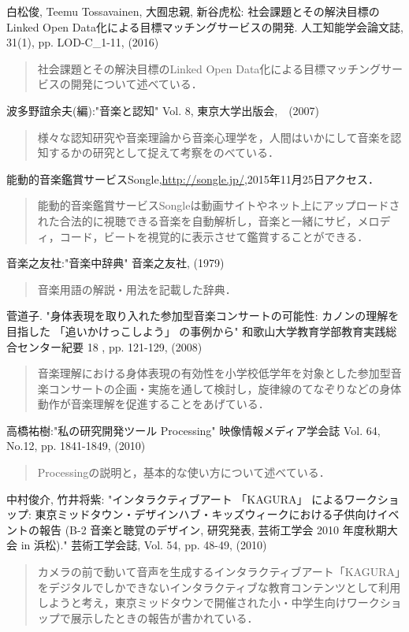 
\begin{thebibliography}{99}

白松俊, Teemu Tossavainen, 大囿忠親, 新谷虎松: 社会課題とその解決目標のLinked Open Data化による目標マッチングサービスの開発. 人工知能学会論文誌, 31(1), pp. LOD-C\_1-11, (2016)
\begin{quote}
社会課題とその解決目標のLinked Open Data化による目標マッチングサービスの開発について述べている．
\end{quote}



波多野誼余夫(編):"音楽と認知" Vol. 8, 東京大学出版会,　(2007)
\begin{quote}
様々な認知研究や音楽理論から音楽心理学を，人間はいかにして音楽を認知するかの研究として捉えて考察をのべている．
\end{quote}

能動的音楽鑑賞サービスSongle,\url{http://songle.jp/},2015年11月25日アクセス．
\begin{quote}
	能動的音楽鑑賞サービスSongleは動画サイトやネット上にアップロードされた合法的に視聴できる音楽を自動解析し，音楽と一緒にサビ，メロディ，コード，ビートを視覚的に表示させて鑑賞することができる．
\end{quote}

音楽之友社:"音楽中辞典" 音楽之友社, (1979)
\begin{quote}
音楽用語の解説・用法を記載した辞典．
\end{quote}

菅道子. "身体表現を取り入れた参加型音楽コンサートの可能性: カノンの理解を目指した 「追いかけっこしよう」 の事例から" 和歌山大学教育学部教育実践総合センター紀要 18 , pp. 121-129, (2008)
\begin{quote}
	音楽理解における身体表現の有効性を小学校低学年を対象とした参加型音楽コンサートの企画・実施を通して検討し，旋律線のてなぞりなどの身体動作が音楽理解を促進することをあげている．
\end{quote}

高橋祐樹:"私の研究開発ツール Processing" 映像情報メディア学会誌 Vol. 64, No.12, pp. 1841-1849, (2010)
\begin{quote}
	Processingの説明と，基本的な使い方について述べている．
\end{quote}

中村俊介, 竹井将紫: "インタラクティブアート 「KAGURA」 によるワークショップ: 東京ミッドタウン・デザインハブ・キッズウィークにおける子供向けイベントの報告 (B-2 音楽と聴覚のデザイン, 研究発表, 芸術工学会 2010 年度秋期大会 in 浜松)."  芸術工学会誌,  Vol. 54, pp. 48-49, (2010)
\begin{quote}
カメラの前で動いて音声を生成するインタラクティブアート「KAGURA」をデジタルでしかできないインタラクティブな教育コンテンツとして利用しようと考え，東京ミッドタウンで開催された小・中学生向けワークショップで展示したときの報告が書かれている．
\end{quote}


\end{thebibliography}
